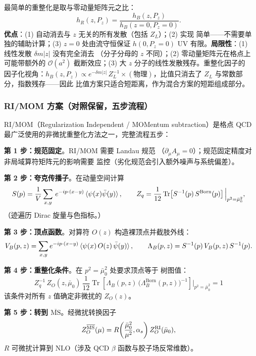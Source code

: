 \documentclass[11pt,a4paper]{ctexart}
\newcommand{\MSbarM}{\overline{\text{MS}}}
\newcommand{\tr}{\operatorname{Tr}}
\newcommand{\abs}[1]{\lvert #1\rvert}
\newcommand{\order}[1]{\mathcal{O}(#1)}
\begin{document}
最简单的重整化是取与零动量矩阵元之比：
\begin{equation}\label{eq:ratio-scheme}
h_R(z, P_z) = \frac{h_B(z, P_z)}{h_B(z=0, P_z=0)}.
\end{equation}
\textbf{优点}：(1) 自动消去与 $z$ 无关的所有发散（包括 $Z_L$）；(2) 实现
简单——不需要单独的辅助计算；(3) $z=0$ 处由流守恒保证 $h(0,P_z=0)$
UV 有限。\textbf{局限性}：(1) 线性发散 $\delta m\abs{z}$ 没有完全消去
（分子分母的 $z$ 不同）；(2) 零动量矩阵元在格点上可能带额外的
$\order{a^2}$ 截断效应；(3) 大 $z$ 分子的线性发散残存。重整化因子的
因子化视角：$h_B(z,P_z)\propto e^{-\delta m\abs{z}}\,Z_L^{-1}
\times(\text{物理})$，比值只消去了 $Z_L$ 与常数部分，指数残存——因此
比值方案只适合短距离，作为混合方案的短距组成部分。

\subsubsection{RI/MOM 方案（对照保留，五步流程）}

RI/MOM（Regularization Independent / MOMentum subtraction）是格点 QCD
最广泛使用的非微扰重整化方法之一，完整流程五步：

\textbf{第 1 步：规范固定}。RI/MOM 需要 Landau 规范
（$\partial_\mu A_\mu=0$）；规范固定精度对非局域算符矩阵元的影响需要
监控（劣化规范会引入额外噪声与系统偏差）。

\textbf{第 2 步：夸克传播子}。在动量空间计算
\begin{equation}
S(p) = \frac{1}{V}\sum_{x,y}\,e^{-ip\cdot(x-y)}
\braket{\psi(x)\bar\psi(y)},
\qquad
Z_q = \frac{1}{12}\tr\!\left[S^{-1}(p)\,S^{\rm Born}(p)\right]
\Big|_{p^2=\bar\mu_0^2},
\end{equation}
（迹遍历 Dirac 旋量与色指标。）

\textbf{第 3 步：顶点函数}。对算符 $O(z)$ 构造裸顶点并截肢外线：
\begin{equation}
V_B(p,z) = \sum_{x,y}e^{-ip\cdot(x-y)}
\braket{\psi(x)\,O(z)\,\bar\psi(y)},
\qquad
\Lambda_B(p,z) = S^{-1}(p)\,V_B(p,z)\,S^{-1}(p).
\end{equation}

\textbf{第 4 步：重整化条件}。在 $p^2=\bar\mu_0^2$ 处要求顶点等于
树图值：
\begin{equation}
Z_q^{-1}\,Z_O(z,\bar\mu_0)\,\frac{1}{12}\tr\!\left[
\Lambda_B(p,z)\,\bigl(\Lambda_B^{\text{Born}}(p,z)\bigr)^{-1}
\right]\Big|_{p^2=\bar\mu_0^2} = 1
\label{eq:RI-MOM-cond}
\end{equation}
该条件对所有 $z$ 值确定非微扰的 $Z_O(z)$。

\textbf{第 5 步：转到 $\MSbarM$}。经微扰转换因子
\begin{equation}
Z_O^{\MSbarM}(\mu) = R\!\left(\frac{\bar\mu_0^2}{\mu^2},\alpha_s\right)
Z_O^{\rm RI}(\bar\mu_0),
\end{equation}
$R$ 可微扰计算到 NLO（涉及 QCD $\beta$ 函数与胶子场反常维数）。
\end{document}
